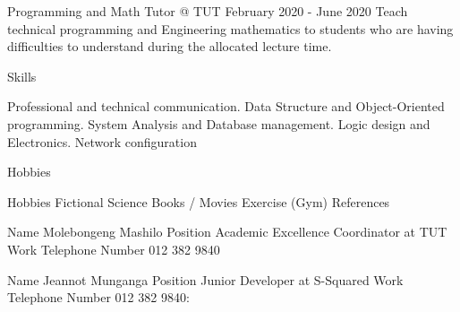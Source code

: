 \documentclass[paper=a4,fontsize=12pt]{article} %
\begin{document}
Programming and Math Tutor @ TUT
February 2020 - June 2020
Teach technical programming and Engineering mathematics to students who are having difficulties to understand during the allocated lecture time.

Skills

Professional and technical communication. Data Structure and Object-Oriented programming. System Analysis and Database management. Logic design and Electronics. Network configuration

Hobbies

Hobbies				Fictional Science Books / Movies 
Exercise (Gym)
References

	Name 	            	Molebongeng Mashilo  
Position				Academic Excellence Coordinator at TUT
Work Telephone Number		012 382 9840

	Name 	            	Jeannot Munganga  
Position				Junior Developer at S-Squared
Work Telephone Number		012 382 9840:
\end{document}

